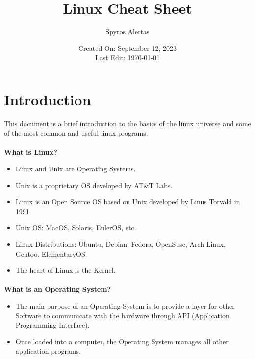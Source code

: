 \documentclass{article}
\title{\bfseries{Linux Cheat Sheet}}
\author{Spyros Alertas}
\date{Created On: September 12, 2023\\Last Edit: \today}
\begin{document}
\begin{titlingpage}
\maketitle
\end{titlingpage}


\tableofcontents


\newpage
\section{Introduction}
\paragraph{} This document is a brief introduction to the basics of the linux universe and some of the most common and useful linux programs.\\
\paragraph{} \textbf{What is Linux?}
\begin{itemize}
	\item Linux and Unix are Operating Systems.
	\item Unix is a proprietary OS developed by AT\&T Labs.
	\item Linux is an Open Source OS based on Unix developed by Linus Torvald in 1991.
	\item Unix OS: MacOS, Solaris, EulerOS, etc.
	\item Linux Distributions: Ubuntu, Debian, Fedora, OpenSuse, Arch Linux, Gentoo. ElementaryOS.
	\item The heart of Linux is the Kernel.
\end{itemize}
\paragraph{} \textbf{What is an Operating System?}
\begin{itemize}
	\item The main purpose of an Operating System is to provide a layer for other Software to communicate with the hardware through API (Application Programming Interface).
	\item Once loaded into a computer, the Operating System manages all other application programs.
\end{itemize}
\end{document}
